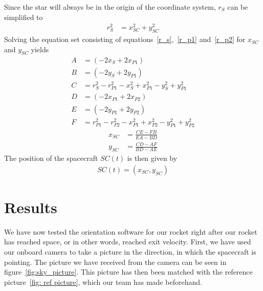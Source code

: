 \documentclass[reprint,english,notitlepage]{revtex4-2}
\begin{document}
Since the star will always be in the origin of the coordinate system, $r_S$ can be simplified to
\begin{align*}
    r_S^2 &= x_{SC}^2 + y_{SC}^2
\end{align*}
Solving the equation set consisting of equations~\eqref{r_s},~\eqref{r_p1} and~\eqref{r_p2} for $x_{SC}$ and $y_{SC}$ yields
\begin{align*}
    A& = \left(-2x_S + 2x_{P1}\right)\\
	B& = \left(-2y_S + 2y_{P1}\right)\\
	C& = r_S^2 - r_{P1}^2 - x_S^2 + x_{P1}^2 - y_S^2 + y_{P1}^2\\
	D& = \left(-2x_{P1} + 2x_{P2}\right)\\
	E& = \left(-2y_{P1} + 2y_{P2}\right)\\
	F& = r_{P1}^2 - r_{P2}^2 - x_{P1}^2 + x_{P2}^2 - y_{P1}^2 + y_{P2}^2
\end{align*}
\begin{align*}
    x_{SC}& = \frac{CE - FB}{EA - BD}\\
	y_{SC}& = \frac{CD - AF}{BD - AE}
\end{align*}
The position of the spacecraft $SC(t)$ is then given by
\begin{align*}
    SC(t) = \left(x_{SC}, y_{SC} \right)
\end{align*}



\section{Results} \label{sec:results}
We have now tested the orientation software for our rocket right after our rocket has reached space, or in other words, reached exit velocity.
First, we have used our onboard camera to take a picture in the direction, in which the spacecraft is pointing.
The picture we have received from the camera can be seen in figure~\ref{fig:sky_picture}.
This picture has then been matched with the reference picture~\ref{fig: ref picture}, which our team has made beforehand.
\end{document}
